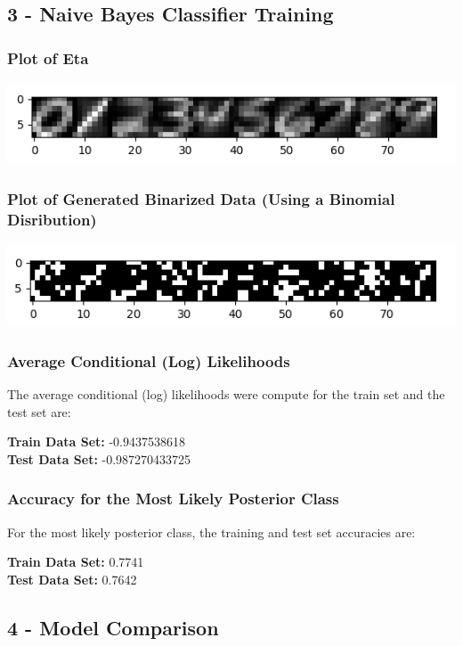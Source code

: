 \documentclass[10pt]{article}
\begin{document}
\subsection{3 -   Naive Bayes Classifier Training}

\subsubsection{Plot of Eta}

\begin{center}
\includegraphics[scale=1]{q2_3_1.png}
\end{center}

\subsubsection{Plot of Generated Binarized Data (Using a Binomial Disribution)}
\begin{center}
\includegraphics[scale=1]{q2_3_1_binomial.png}
\end{center}


\subsubsection{Average Conditional (Log) Likelihoods}

The average conditional (log) likelihoods were compute for the train set and the test set are:
\begin{center}
\textbf{Train Data Set: } -0.9437538618
\\
\textbf{Test Data Set: } -0.987270433725
\end{center}

\subsubsection{Accuracy for the Most Likely Posterior Class}

For the most likely posterior class, the training and test set accuracies are: 
\begin{center}
\textbf{Train Data Set: } 0.7741
\\
\textbf{Test Data Set: } 0.7642
\end{center}



\subsection{4 -  Model Comparison}


\pagebreak
\end{document}
